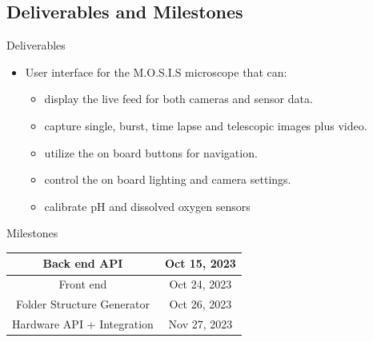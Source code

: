 \documentclass[17pt, aspectratio=169]{beamer}
\begin{document}
\subsection*{Deliverables and Milestones}
\begin{frame}{Deliverables}
	\begin{itemize}
		\item User interface for the M.O.S.I.S microscope that can:
		      \begin{itemize}
			      \item display the live feed for both cameras and sensor data.
			      \item capture single, burst, time lapse and telescopic images plus video.
			      \item utilize the on board buttons for navigation.
			      \item control the on board lighting and camera settings.
			      \item calibrate pH and dissolved oxygen sensors
		      \end{itemize}
	\end{itemize}

\end{frame}
\begin{frame}{Milestones}
	\begin{center}
		\begin{tabular}{||c | c||}
			\hline
			Back end API               & Oct 15, 2023 \\
			\hline
			Front end                  & Oct 24, 2023 \\
			\hline
			Folder Structure Generator & Oct 26, 2023 \\
			\hline
			Hardware API + Integration & Nov 27, 2023 \\
			\hline
		\end{tabular}
	\end{center}
\end{frame}
\end{document}
